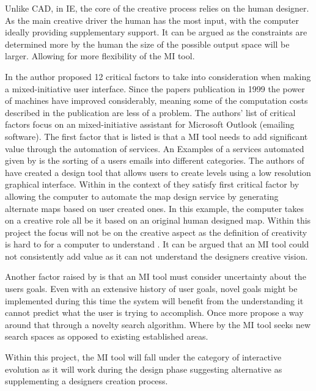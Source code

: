 \documentclass[journal]{IEEEtran}
\begin{document}
Unlike CAD, in IE,  the core of the creative process relies on the human designer. As the main creative driver the human has the most input, with the computer ideally providing supplementary support. It can be argued as the constraints are determined more by the human the size of the possible output space will be larger. Allowing for more flexibility of the MI tool.


 

In \cite{horvitz1999principles} the author proposed 12 critical factors to take into consideration when making a mixed-initiative user interface. Since the papers publication in 1999 the power of machines have improved considerably, meaning some of the computation costs described in the publication are less of a problem. The authors' list of critical factors focus on an mixed-initiative assistant for Microsoft Outlook (emailing software).  The first factor that is listed is that a MI tool needs to add significant value through the automation of services. An Examples of a services automated given by \cite{horvitz1999principles} is the sorting of a users emails into different categories.  The authors of \cite{liapis2013sentient} have created a design tool that allows users to create levels using a low resolution graphical interface.  Within in the context of \cite{liapis2013sentient}  they satisfy \cite{horvitz1999principles} first critical factor by allowing the computer to automate the map design service by generating alternate maps based on user created ones. In this example, the computer takes on a creative role all be it based on an original human designed map. Within this project the focus will not be on the creative aspect as the definition of creativity is hard to for a computer to understand \cite{jordanous2010defining}. It can be argued that an MI tool could not consistently add value as it can not understand the designers creative vision. 

Another factor raised by \cite{horvitz1999principles} is that an MI tool must consider uncertainty about the users goals. Even with an extensive history of user goals, novel goals might be implemented during this time the system will benefit from the understanding it cannot predict what the user is trying to accomplish.   Once more  \cite{liapis2013sentient} propose a way around that through a novelty search algorithm. Where by the MI tool seeks new search spaces as opposed to existing established areas. 

Within this project, the MI tool will fall under the category of interactive evolution as it will work during the design phase suggesting alternative as supplementing a designers creation process. 
\end{document}
